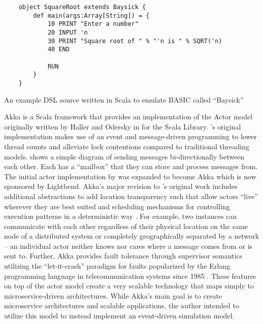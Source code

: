\begin{listing}[bt!]
    \begin{verbatim}
    object SquareRoot extends Baysick {
        def main(args:Array[String]) = {
            10 PRINT "Enter a number"
            20 INPUT 'n
            30 PRINT "Square root of " % "'n is " % SQRT('n)
            40 END
            
            RUN
        }
    }
    \end{verbatim}
    \caption{An example DSL source written in Scala to emulate BASIC called ``Baysick'' \cite{FogusBaysick}}
    \label{lst:scala-dsl-basic}
\end{listing}

Akka is a Scala framework that provides an implementation of the Actor model \cite{Agha1985} originally written by Haller and Odersky in \cite{Haller2009} for the Scala Library. \cite{Haller2009}'s original implementation makes use of an event and message-driven programming to lower thread counts and alleviate lock contentions compared to traditional threading models.  shows a simple diagram of \akkaActor{} sending messages bi-directionally between each other. Each \akkaActor{} has a ``mailbox'' that they can store and process messages from. The initial actor implementation by \cite{Haller2009} was expanded to become Akka which is now sponsored by Lightbend. Akka's major revision to \cite{Haller2009}'s original work includes additional abstractions to add location transparency such that allow actors ``live'' wherever they are best suited  and scheduling mechanisms for controlling \akkaActor{} execution patterns in a deterministic way \cite{TypesafeAkka2015}. For example, two \akkaActor{} instances can communicate with each other regardless of their physical location on the same node of a distributed system or completely geographically separated by a network -- an individual actor neither knows nor cares where a message comes from or is sent to. Further, Akka provides fault tolerance through supervisor semantics utilizing the ``let-it-crash'' paradigm for faults popularized by the Erlang programming language in telecommunication systems since 1985 \cite{Armstrong2010}. These features on top of the actor model create a very scalable technology that maps simply to microservice-driven architectures. While Akka's main goal is to create microservice architectures and scalable applications, the author intended to utilize this model to instead implement an event-driven simulation model.

